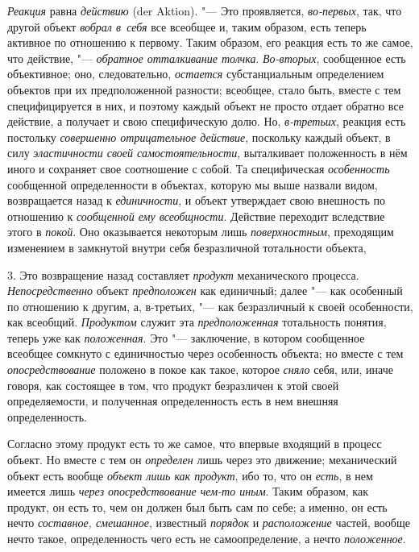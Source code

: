 {\em Реакция} равна
{\em действию} (der Aktion). "---
Это проявляется,
{\em во-первых},
так, что другой объект
{\em вобрал в~себя} все
всеобщее и, таким образом, есть теперь активное по отношению к первому.
Таким образом, его реакция есть то же самое, что действие, "---
{\em обратное отталкивание толчка}.
{\em Во-вторых},
сообщенное есть объективное; оно, следовательно,
{\em остается}
субстанциальным определением объектов при их предположенной
разности; всеобщее, стало быть, вместе с тем специфицируется в них, и
поэтому каждый объект не просто отдает обратно все действие, а получает и
свою специфическую долю. Но,
{\em в-третьих}, реакция
есть постольку {\em совершенно
отрицательное действие}, поскольку каждый объект, в силу
{\em эластичности своей
самостоятельности}, выталкивает положенность в нём иного и
сохраняет свое соотношение с собой. Та специфическая
{\em особенность}
сообщенной определенности в объектах, которую мы выше назвали
видом, возвращается назад к
{\em единичности}, и
объект утверждает свою внешность по отношению к
{\em сообщенной ему всеобщности}.
Действие переходит вследствие этого в
{\em покой}. Оно
оказывается некоторым лишь
{\em поверхностным},
преходящим изменением в замкнутой внутри себя безразличной
тотальности объекта,

3. Это возвращение назад составляет
{\em продукт}
механического процесса. {\em Непосредственно} объект {\em предположен}
как единичный; далее "--- как особенный по отношению к другим, а,
в-третьих, "--- как безразличный к своей особенности, как всеобщий.
{\em Продуктом} служит эта {\em предположенная} тотальность понятия,
теперь уже как {\em положенная}. Это "--- заключение,
в котором сообщенное всеобщее сомкнуто с единичностью через
особенность объекта; но вместе с тем {\em опосредствование}
положено в покое как такое, которое {\em сняло} себя, или,
иначе говоря, как состоящее в том, что продукт безразличен к этой своей
определяемости, и полученная определенность есть в нем внешняя определенность.

Согласно этому продукт есть то же самое, что впервые входящий
в процесс объект. Но вместе с тем он {\em определен} лишь
через это движение; механический объект есть вообще
{\em объект лишь как продукт}, ибо то, что он {\em есть}, в нем имеется
лишь {\em через опосредствование
чем-то иным}. Таким образом, как продукт, он есть то,
чем он должен был быть сам по себе; а именно, он есть нечто
{\em составное, смешанное}, известный {\em порядок} и {\em расположение}
частей, вообще нечто такое, определенность чего есть не
самоопределение, а нечто {\em положенное}.

